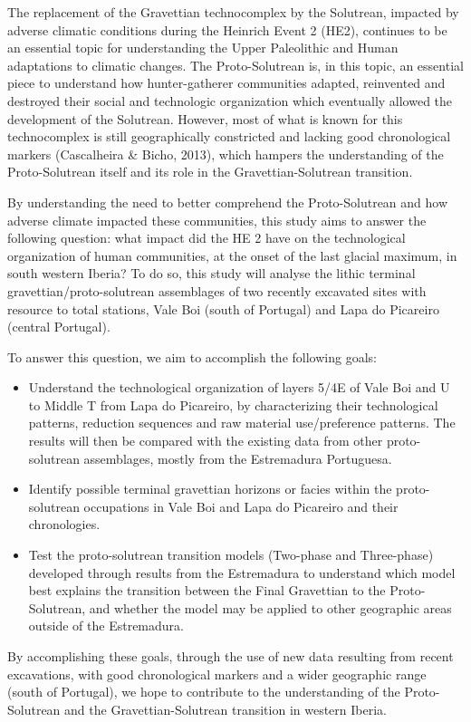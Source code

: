 \documentclass[12pt,twoside]{reedthesis}
\begin{document}
The replacement of the Gravettian technocomplex by the Solutrean, impacted by adverse climatic conditions during the Heinrich Event 2 (HE2), continues to be an essential topic for understanding the Upper Paleolithic and Human adaptations to climatic changes. The Proto-Solutrean is, in this topic, an essential piece to understand how hunter-gatherer communities adapted, reinvented and destroyed their social and technologic organization which eventually allowed the development of the Solutrean. However, most of what is known for this technocomplex is still geographically constricted and lacking good chronological markers (Cascalheira \& Bicho, 2013), which hampers the understanding of the Proto-Solutrean itself and its role in the Gravettian-Solutrean transition.

By understanding the need to better comprehend the Proto-Solutrean and how adverse climate impacted these communities, this study aims to answer the following question: what impact did the HE 2 have on the technological organization of human communities, at the onset of the last glacial maximum, in south western Iberia? To do so, this study will analyse the lithic terminal gravettian/proto-solutrean assemblages of two recently excavated sites with resource to total stations, Vale Boi (south of Portugal) and Lapa do Picareiro (central Portugal).

To answer this question, we aim to accomplish the following goals:
\begin{itemize}
\item
  Understand the technological organization of layers 5/4E of Vale Boi and U to Middle T from Lapa do Picareiro, by characterizing their technological patterns, reduction sequences and raw material use/preference patterns. The results will then be compared with the existing data from other proto-solutrean assemblages, mostly from the Estremadura Portuguesa.
\item
  Identify possible terminal gravettian horizons or facies within the proto-solutrean occupations in Vale Boi and Lapa do Picareiro and their chronologies.
\item
  Test the proto-solutrean transition models (Two-phase and Three-phase) developed through results from the Estremadura to understand which model best explains the transition between the Final Gravettian to the Proto-Solutrean, and whether the model may be applied to other geographic areas outside of the Estremadura.
\end{itemize}
By accomplishing these goals, through the use of new data resulting from recent excavations, with good chronological markers and a wider geographic range (south of Portugal), we hope to contribute to the understanding of the Proto-Solutrean and the Gravettian-Solutrean transition in western Iberia.
\end{document}
